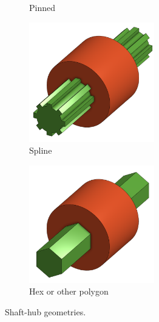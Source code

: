 \documentclass[10pt,letterpaper]{book}
\begin{document}
\begin{figure}[H]
\begin{subfigure}[b]{.32\linewidth}
			\caption{Pinned}
		\end{subfigure}
		\begin{subfigure}[b]{.32\linewidth}
			\includegraphics[width=0.6\textwidth]{imgs/splineshaft.png}
			\caption{Spline}
		\end{subfigure}
		\begin{subfigure}[b]{.32\linewidth}
			\includegraphics[width=0.6\textwidth]{imgs/hexshaft.png}
			\caption{Hex or other polygon}
		\end{subfigure}
		
		\caption{Shaft-hub geometries.}
	\end{figure}
	
\end{document}
